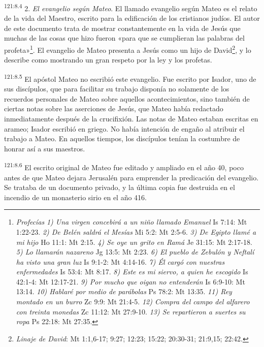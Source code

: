\par 
\textsuperscript{121:8.4} 2. \textit{El evangelio según Mateo}. El llamado evangelio según Mateo es el relato de la vida del Maestro, escrito para la edificación de los cristianos judíos. El autor de este documento trata de mostrar constantemente en la vida de Jesús que muchas de las cosas que hizo fueron «para que se cumplieran las palabras del profeta»\footnote{\textit{Profecías} \textit{1) Una virgen concebirá a un niño llamado Emanuel} Is 7:14: Mt 1:22-23. \textit{2) De Belén saldrá el Mesías} Mi 5:2: Mt 2:5-6. \textit{3) De Egipto llamé a mi hijo} Ho 11:1: Mt 2:15. \textit{4) Se oye un grito en Ramá} Je 31:15: Mt 2:17-18. \textit{5) Lo llamarán nazareno} Jg 13:5: Mt 2:23. \textit{6) El pueblo de Zebulón y Neftalí ha visto una gran luz} Is 9:1-2: Mt 4:14-16. \textit{7) Él cargó con nuestras enfermedades} Is 53:4: Mt 8:17. \textit{8) Este es mi siervo, a quien he escogido} Is 42:1-4: Mt 12:17-21. \textit{9) Por mucho que oigan no entenderán} Is 6:9-10: Mt 13:14. \textit{10) Hablaré por medio de parábolas} Ps 78:2: Mt 13:35. \textit{11) Rey montado en un burro} Zc 9:9: Mt 21:4-5. \textit{12) Compra del campo del alfarero con treinta monedas} Zc 11:12: Mt 27:9-10. \textit{13) Se repartieron a suertes su ropa} Ps 22:18: Mt 27:35.}. El evangelio de Mateo presenta a Jesús como un hijo de David\footnote{\textit{Linaje de David}: Mt 1:1,6-17; 9:27; 12:23; 15:22; 20:30-31; 21:9,15; 22:42.}, y lo describe como mostrando un gran respeto por la ley y los profetas.

\par 
\textsuperscript{121:8.5} El apóstol Mateo no escribió este evangelio. Fue escrito por Isador, uno de sus discípulos, que para facilitar su trabajo disponía no solamente de los recuerdos personales de Mateo sobre aquellos acontecimientos, sino también de ciertas notas sobre las aserciones de Jesús, que Mateo había redactado inmediatamente después de la crucifixión. Las notas de Mateo estaban escritas en arameo; Isador escribió en griego. No había intención de engaño al atribuir el trabajo a Mateo. En aquellos tiempos, los discípulos tenían la costumbre de honrar así a sus maestros.

\par 
\textsuperscript{121:8.6} El escrito original de Mateo fue editado y ampliado en el año
40, poco antes de que Mateo dejara Jerusalén para emprender la predicación del evangelio. Se trataba de un documento privado, y la última copia fue destruida en el incendio de un monasterio sirio en el año 416.

